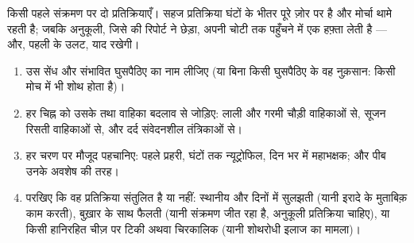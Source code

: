 \begin{omfigure}

{\small किसी पहले संक्रमण पर दो प्रतिक्रियाएँ। सहज प्रतिक्रिया घंटों के भीतर
पूरे ज़ोर पर है और मोर्चा थामे रहती है; जबकि अनुकूली, जिसे 
की रिपोर्ट ने छेड़ा, अपनी चोटी तक पहुँचने में एक हफ़्ता लेती है --- और, पहली
के उलट, याद रखेगी।}
\end{omfigure}

\begin{method}[किसी शोथ को पढ़ना]\label{met:g12:innate-immunity:read}
\begin{enumerate}
  \item उस सेंध और संभावित घुसपैठिए का नाम लीजिए (या बिना किसी घुसपैठिए के
        वह नुक़सान: किसी मोच में भी शोथ होता है)।
  \item हर चिह्न को उसके  तथा वाहिका बदलाव से जोड़िए: लाली और गरमी
        चौड़ी वाहिकाओं से, सूजन रिसती वाहिकाओं से, और दर्द संवेदनशील
        तंत्रिकाओं से।
  \item हर चरण पर मौजूद  पहचानिए: पहले प्रहरी, घंटों तक
        न्यूट्रोफिल, दिन भर में महाभक्षक; और पीब उनके अवशेष की तरह।
  \item परखिए कि वह प्रतिक्रिया संतुलित है या नहीं: स्थानीय और दिनों में
        सुलझती (यानी इरादे के मुताबिक़ काम करती), बुख़ार के साथ फैलती
        (यानी संक्रमण जीत रहा है, अनुकूली प्रतिक्रिया चाहिए), या किसी
        हानिरहित चीज़ पर टिकी अथवा चिरकालिक (यानी शोथरोधी इलाज का मामला)।
\end{enumerate}
\end{method}

